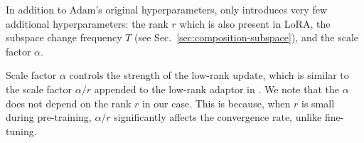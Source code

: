In addition to Adam's original hyperparameters, \lowrank{} only introduces very few additional hyperparameters: the rank $r$ which is also present in LoRA, the subspace change frequency $T$ (see Sec.~\ref{sec:composition-subspace}), and the scale factor $\alpha$. 

Scale factor $\alpha$ controls the strength of the low-rank update, which is similar to the scale factor $\alpha/r$ appended to the low-rank adaptor in \citet{huLoRALowRankAdaptation2021}.
We note that the $\alpha$ does not depend on the rank $r$ in our case. 
This is because, when $r$ is small during pre-training, $\alpha/r$ significantly affects the convergence rate, unlike fine-tuning.






